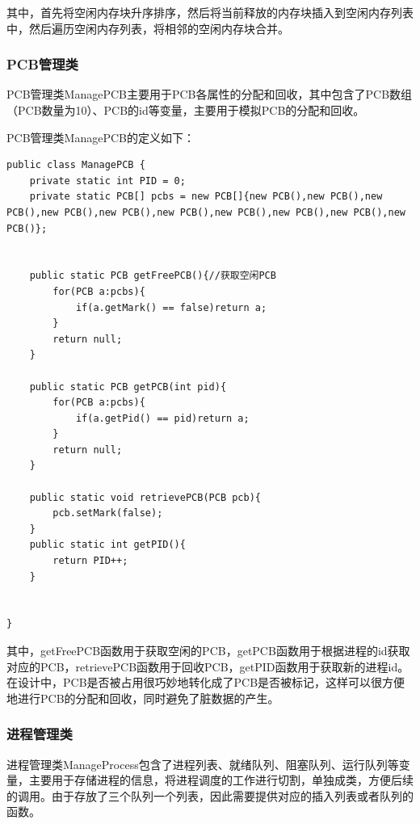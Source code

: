 \documentclass[UTF8,12pt]{article}
\begin{document}
其中，首先将空闲内存块升序排序，然后将当前释放的内存块插入到空闲内存列表中，然后遍历空闲内存列表，将相邻的空闲内存块合并。

\subsubsection{PCB管理类}
PCB管理类ManagePCB主要用于PCB各属性的分配和回收，其中包含了PCB数组（PCB数量为10）、PCB的id等变量，主要用于模拟PCB的分配和回收。

PCB管理类ManagePCB的定义如下：
\begin{lstlisting}[title=PCB管理类定义,frame=shadowbox]
public class ManagePCB {
    private static int PID = 0;
    private static PCB[] pcbs = new PCB[]{new PCB(),new PCB(),new PCB(),new PCB(),new PCB(),new PCB(),new PCB(),new PCB(),new PCB(),new PCB()};


    public static PCB getFreePCB(){//获取空闲PCB
        for(PCB a:pcbs){
            if(a.getMark() == false)return a;
        }
        return null;
    }

    public static PCB getPCB(int pid){
        for(PCB a:pcbs){
            if(a.getPid() == pid)return a;
        }
        return null;
    }

    public static void retrievePCB(PCB pcb){
        pcb.setMark(false);
    }
    public static int getPID(){
        return PID++;
    }


}
\end{lstlisting}

其中，getFreePCB函数用于获取空闲的PCB，getPCB函数用于根据进程的id获取对应的PCB，retrievePCB函数用于回收PCB，getPID函数用于获取新的进程id。在设计中，PCB是否被占用很巧妙地转化成了PCB是否被标记，这样可以很方便地进行PCB的分配和回收，同时避免了脏数据的产生。

\subsubsection{进程管理类}
进程管理类ManageProcess包含了进程列表、就绪队列、阻塞队列、运行队列等变量，主要用于存储进程的信息，将进程调度的工作进行切割，单独成类，方便后续的调用。由于存放了三个队列一个列表，因此需要提供对应的插入列表或者队列的函数。
\end{document}
